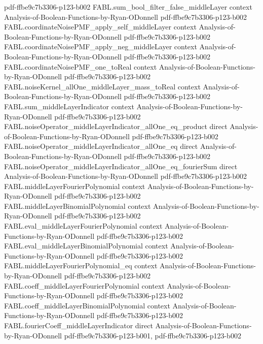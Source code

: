 \begin{theorem}
  {pdf-ffbe9c7b3306-p123-b002}
\proofstep
  {FABL.sum_bool_filter_false_middleLayer}
  {context}
  {Analysis-of-Boolean-Functions-by-Ryan-ODonnell}
  {pdf-ffbe9c7b3306-p123-b002}
\proofstep
  {FABL.coordinateNoisePMF_apply_self_middleLayer}
  {context}
  {Analysis-of-Boolean-Functions-by-Ryan-ODonnell}
  {pdf-ffbe9c7b3306-p123-b002}
\proofstep
  {FABL.coordinateNoisePMF_apply_neg_middleLayer}
  {context}
  {Analysis-of-Boolean-Functions-by-Ryan-ODonnell}
  {pdf-ffbe9c7b3306-p123-b002}
\proofstep
  {FABL.coordinateNoisePMF_one_toReal}
  {context}
  {Analysis-of-Boolean-Functions-by-Ryan-ODonnell}
  {pdf-ffbe9c7b3306-p123-b002}
\proofstep
  {FABL.noiseKernel_allOne_middleLayer_mass_toReal}
  {context}
  {Analysis-of-Boolean-Functions-by-Ryan-ODonnell}
  {pdf-ffbe9c7b3306-p123-b002}
\proofstep
  {FABL.sum_middleLayerIndicator}
  {context}
  {Analysis-of-Boolean-Functions-by-Ryan-ODonnell}
  {pdf-ffbe9c7b3306-p123-b002}
\proofstep
  {FABL.noiseOperator_middleLayerIndicator_allOne_eq_product}
  {direct}
  {Analysis-of-Boolean-Functions-by-Ryan-ODonnell}
  {pdf-ffbe9c7b3306-p123-b002}
\proofstep
  {FABL.noiseOperator_middleLayerIndicator_allOne_eq}
  {direct}
  {Analysis-of-Boolean-Functions-by-Ryan-ODonnell}
  {pdf-ffbe9c7b3306-p123-b002}
\proofstep
  {FABL.noiseOperator_middleLayerIndicator_allOne_eq_fourierSum}
  {direct}
  {Analysis-of-Boolean-Functions-by-Ryan-ODonnell}
  {pdf-ffbe9c7b3306-p123-b002}
\proofstep
  {FABL.middleLayerFourierPolynomial}
  {context}
  {Analysis-of-Boolean-Functions-by-Ryan-ODonnell}
  {pdf-ffbe9c7b3306-p123-b002}
\proofstep
  {FABL.middleLayerBinomialPolynomial}
  {context}
  {Analysis-of-Boolean-Functions-by-Ryan-ODonnell}
  {pdf-ffbe9c7b3306-p123-b002}
\proofstep
  {FABL.eval_middleLayerFourierPolynomial}
  {context}
  {Analysis-of-Boolean-Functions-by-Ryan-ODonnell}
  {pdf-ffbe9c7b3306-p123-b002}
\proofstep
  {FABL.eval_middleLayerBinomialPolynomial}
  {context}
  {Analysis-of-Boolean-Functions-by-Ryan-ODonnell}
  {pdf-ffbe9c7b3306-p123-b002}
\proofstep
  {FABL.middleLayerFourierPolynomial_eq}
  {context}
  {Analysis-of-Boolean-Functions-by-Ryan-ODonnell}
  {pdf-ffbe9c7b3306-p123-b002}
\proofstep
  {FABL.coeff_middleLayerFourierPolynomial}
  {context}
  {Analysis-of-Boolean-Functions-by-Ryan-ODonnell}
  {pdf-ffbe9c7b3306-p123-b002}
\proofstep
  {FABL.coeff_middleLayerBinomialPolynomial}
  {context}
  {Analysis-of-Boolean-Functions-by-Ryan-ODonnell}
  {pdf-ffbe9c7b3306-p123-b002}
\proofstep
  {FABL.fourierCoeff_middleLayerIndicator}
  {direct}
  {Analysis-of-Boolean-Functions-by-Ryan-ODonnell}
  {pdf-ffbe9c7b3306-p123-b001,
    pdf-ffbe9c7b3306-p123-b002}

\end{theorem}
